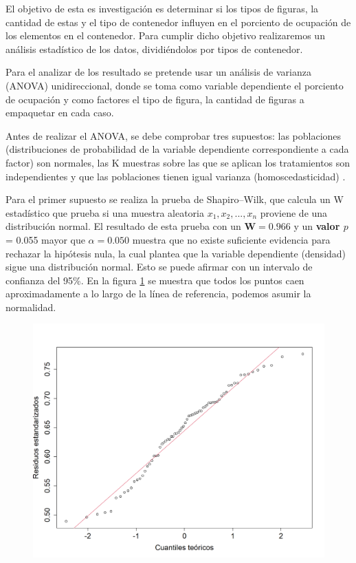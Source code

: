 \documentclass[5p,times]{elsarticle}
\begin{document}
El objetivo de esta es investigación es determinar si los tipos de figuras, la cantidad de estas y el tipo de contenedor influyen en el porciento de ocupación de los elementos en el contenedor. Para cumplir dicho objetivo realizaremos un análisis estadístico de los datos, dividiéndolos por tipos de contenedor.
 
Para el analizar de los resultado se pretende usar un análisis de varianza (ANOVA) unidireccional, donde se toma como variable dependiente el porciento de ocupación y como factores el tipo de figura, la cantidad de figuras a empaquetar en cada caso.
	
Antes de realizar el ANOVA, se debe comprobar tres supuestos: las poblaciones (distribuciones de probabilidad de la variable dependiente correspondiente a cada factor) son normales, las K muestras sobre las que se aplican los tratamientos son independientes y que las poblaciones tienen igual varianza (homoscedasticidad) \cite{Anl}.

Para el primer supuesto se realiza la prueba de Shapiro--Wilk, que calcula un W estadístico que prueba si una muestra aleatoria $x_{1}, x_{2}, ..., x_{n}$ proviene de una distribución normal. El resultado de esta prueba con un $\textbf{W}=0.966$ y un \textbf{valor $p$} = 0.055 mayor que $\alpha = 0.050$ muestra que no existe suficiente evidencia para rechazar la hipótesis nula, la cual plantea que la variable dependiente (densidad) sigue una distribución normal. Esto se puede afirmar con un intervalo de confianza del 95\%. En la figura \ref{fig:normal1} se muestra que todos los puntos caen aproximadamente a lo largo de la línea de referencia, podemos asumir la normalidad.
	\begin{figure}
				\begin{center}
					\includegraphics[scale=0.35]{figuras/sseccnormal.png}
					\label{fig:normal1}
				\end{center}
			\end{figure}
			
\end{document}
